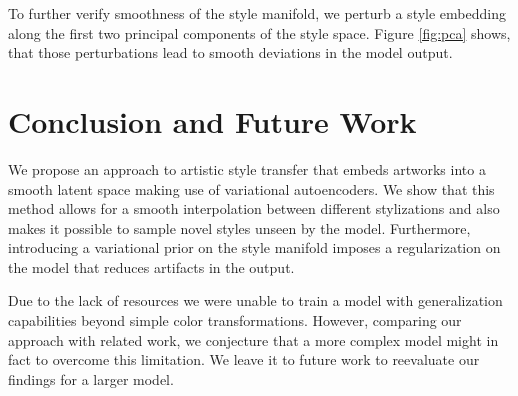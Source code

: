 \documentclass[10pt,twocolumn,letterpaper]{article}
\begin{document}
To further verify smoothness of the style manifold, we perturb a style embedding along the first two principal components of the style space. Figure \ref{fig:pca} shows, that those perturbations lead to smooth deviations in the model output.

\section{Conclusion and Future Work}

We propose an approach to artistic style transfer that embeds artworks into a smooth latent space making use of variational autoencoders. We show that this method allows for a smooth interpolation between different stylizations and also makes it possible to sample novel styles unseen by the model. Furthermore, introducing a variational prior on the style manifold imposes a regularization on the model that reduces artifacts in the output. 

Due to the lack of resources we were unable to train a model with generalization capabilities beyond simple color transformations. However, comparing our approach with related work, we conjecture that a more complex model might in fact to overcome this limitation. We leave it to future work to reevaluate our findings for a larger model.

{\small


}
\end{document}
